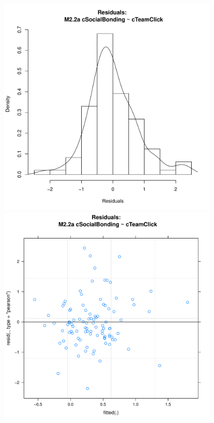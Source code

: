 \documentclass[12pt]{report}
\begin{document}
{\begin{figure}[htbp]
  \includegraphics[scale =.4]{../images/MLM22aHist.pdf}
  \includegraphics[scale =.4]{../images/MLM22aScatter.pdf}

\end{figure}}
\end{document}

